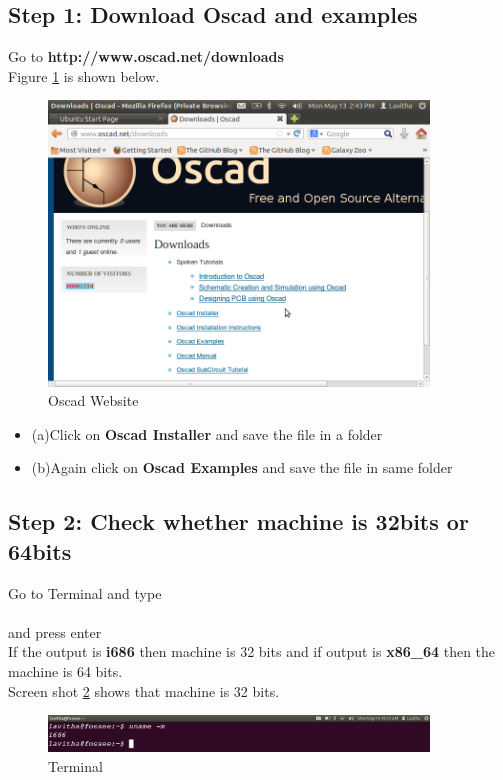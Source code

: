 \subsection {Step 1: Download Oscad and examples}
Go to \textbf{http://www.oscad.net/downloads}\\
Figure \ref{fig: Oscad Website} is shown below.\\
\newpage
\begin{figure}[h]
\centering
\includegraphics[width=0.9\textwidth]{figures/oscad1.png}
\caption{Oscad Website}
\label{fig: Oscad Website}
\end{figure}
\begin{itemize}
\item (a)Click on \textbf{Oscad Installer} and save the file in a folder\\
\item (b)Again click on \textbf{Oscad Examples} and save the file in same folder\\
\end{itemize}
\subsection {Step 2: Check whether machine is 32bits or 64bits }
Go to Terminal and type\\
\\and press enter\\
If the output is \textbf{i686}  then machine is 32 bits and if output is \textbf{x86\_64} then the machine is 64 bits.\\
Screen shot \ref{Terminall} shows that machine is 32 bits.
\begin{figure}[h!]
\centering
\includegraphics[width=0.9\textwidth]{figures/one.png}
\caption{Terminal}
\label{Terminall}
\end{figure}
